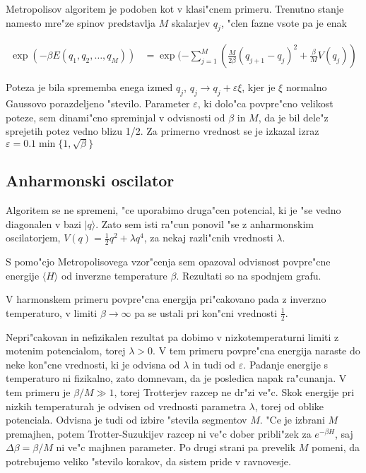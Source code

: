\documentclass[a4paper,10pt]{article}
\begin{document}
Metropolisov algoritem je podoben kot v klasi"cnem primeru.
Trenutno stanje namesto mre"ze spinov predstavlja $M$ skalarjev $q_j$, "clen fazne vsote pa je enak

\begin{align}
 \exp\left(-\beta E(q_1, q_2, \ldots, q_M)\right) &= \exp(-\sum_{j=1}^M \left( \frac{M}{2\beta} (q_{j+1} - q_j)^2 + \frac{\beta}{M} V(q_j) \right)
\end{align}

Poteza je bila sprememba enega izmed $q_j$, $q_j \to q_j + \varepsilon \xi$, kjer je $\xi$ normalno Gaussovo porazdeljeno "stevilo. 
Parameter $\varepsilon$, ki dolo"ca povpre"cno velikost poteze, sem dinami"cno spreminjal v odvisnosti od $\beta$ in $M$, da je bil dele"z sprejetih potez vedno blizu 1/2.
Za primerno vrednost se je izkazal izraz $\varepsilon = 0.1 \min\{1, \sqrt{\beta}\}$

\subsection{Anharmonski oscilator}

Algoritem se ne spremeni, "ce uporabimo druga"cen potencial, ki je "se vedno diagonalen v bazi $|q\rangle$. 
Zato sem isti ra"cun ponovil "se z anharmonskim oscilatorjem, $V(q) = \frac{1}{2}q^2 + \lambda q^4$, za nekaj razli"cnih vrednosti $\lambda$. 

S pomo"cjo Metropolisovega vzor"cenja sem opazoval odvisnost povpre"cne energije $\langle H \rangle$ od inverzne temperature $\beta$. 
Rezultati so na spodnjem grafu. 

\begin{figure}[H]
 \centering
 
\end{figure}

V harmonskem primeru povpre"cna energija pri"cakovano pada z inverzno temperaturo, v limiti $\beta \to \infty$ pa se ustali pri kon"cni vrednosti $\frac{1}{2}$. 

Nepri"cakovan in nefizikalen rezultat pa dobimo v nizkotemperaturni limiti z motenim potencialom, torej $\lambda > 0$. 
V tem primeru povpre"cna energija naraste do neke kon"cne vrednosti, ki je odvisna od $\lambda$ in tudi od $\varepsilon$. 
Padanje energije s temperaturo ni fizikalno, zato domnevam, da je posledica napak ra"cunanja. 
V tem primeru je $\beta/M \gg 1$, torej Trotterjev razcep ne dr"zi ve"c. 
Skok energije pri nizkih temperaturah je odvisen od vrednosti parametra $\lambda$, torej od oblike potenciala. 
Odvisna je tudi od izbire "stevila segmentov $M$. 
"Ce je izbrani $M$ premajhen, potem Trotter-Suzukijev razcep ni ve"c dober pribli"zek za $e^{-\beta H}$, saj $\Delta\beta = \beta/M$ ni ve"c majhnen parameter. 
Po drugi strani pa prevelik $M$ pomeni, da potrebujemo veliko "stevilo korakov, da sistem pride v ravnovesje. 
\end{document}
